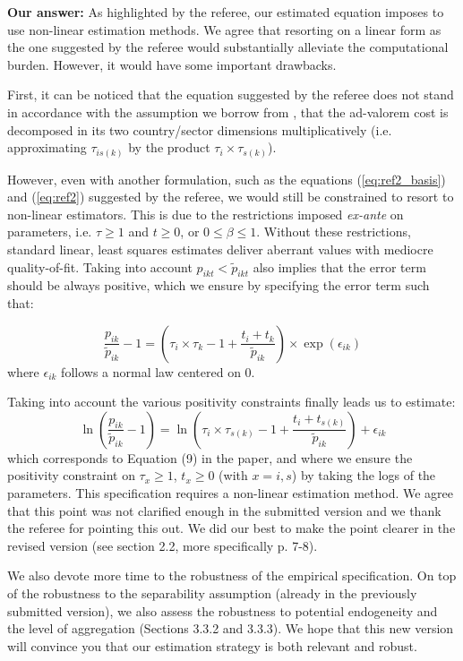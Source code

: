 \documentclass[a4paper,11pt]{article}
\begin{document}
\textbf{Our answer:} As highlighted by the referee, our estimated equation imposes to use non-linear estimation methods. We agree that resorting on a linear form as the one suggested by the referee would substantially alleviate the computational burden. However, it would have some important drawbacks.

First, it can be noticed that the equation suggested by the referee does not stand in accordance with the assumption we borrow from \cite{Irrazabal_2015}, that the ad-valorem cost is decomposed in its two country/sector dimensions multiplicatively (i.e. approximating $\tau_{is(k)}$ by the product $\tau_i\times \tau_{s(k)}$).

However, even with another formulation, such as the equations (\ref{eq:ref2_basis}) and (\ref{eq:ref2}) suggested by the referee, we would still be constrained to resort to non-linear estimators. This is due to the restrictions imposed \textit{ex-ante} on parameters, i.e. $\tau \geq 1$ and $t\geq 0$, or $0 \leq \beta \leq 1$. Without these restrictions, standard linear, least squares estimates deliver aberrant values with mediocre quality-of-fit. Taking into account $p_{ikt} < \widetilde{p}_{ikt}$ also implies that the error term should be always positive, which we ensure by specifying the error term such that:

\begin{equation*}
\frac{p_{ik}}{\widetilde{p}_{ik}}-1 =\left(\tau_{i}\times \tau_{k} -1+\frac{t_{i} + t_{k}}{\widetilde{p}_{ik}} \right)\times \exp(\epsilon_{ik})
\end{equation*}
\noindent where $\epsilon_{ik}$ follows a normal law centered on 0.

Taking into account the various positivity constraints finally leads us to estimate:
\begin{equation}
\ln\left(\frac{p_{ik}}{\widetilde{p}_{ik}}-1 \right)= \ln \left(\tau_{i}\times \tau_{s(k)} -1+\frac{t_{i} + t_{s(k)}}{\widetilde{p}_{ik}} \right) + \epsilon_{ik} \label{eq:model_IetA}
\end{equation}
\noindent which corresponds to Equation (9) in the paper, and where we ensure the positivity constraint on $\tau_x\geq 1$, $t_x \geq 0$ (with  $x = i, s$) by taking the logs of the parameters. This specification requires a non-linear estimation method. We agree that this point was not clarified enough in the submitted version and we thank the referee for pointing this out. We did our best to make the point clearer in the revised version (see section 2.2, more specifically p. 7-8).

We also devote more time to the robustness of the empirical specification. On top of the robustness to the separability assumption (already in the previously submitted version), we also assess the robustness to potential endogeneity and the level of aggregation (Sections 3.3.2 and 3.3.3). We hope that this new version will convince you that our estimation strategy is both relevant and robust.



\newpage


\end{document}
